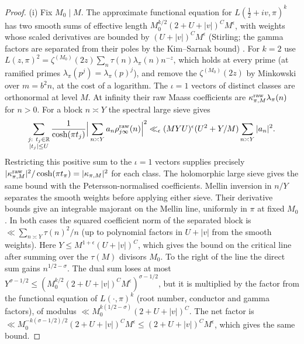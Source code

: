 \documentclass[11pt,colorlinks]{charlie}
\begin{document}
\begin{proof}
(i) Fix $M_0\mid M$. The approximate functional equation for $L(\frac12+iv,\pi)^k$ has two smooth sums of effective length $M_0^{k/2}(2+U+|v|)^{C}M^\epsilon$, with weights whose scaled derivatives are bounded by $(U+|v|)^C M^\epsilon$ (Stirling; the gamma factors are separated from their poles by the Kim--Sarnak bound) \cite[Theorem~5.3]{IK}. For $k=2$ use $L(z,\pi)^2=\zeta^{(M_0)}(2z)\sum_n\tau(n)\lambda_\pi(n)n^{-z}$, which holds at every prime (at ramified primes $\lambda_\pi(p^j)=\lambda_\pi(p)^j$), and remove the $\zeta^{(M_0)}(2z)$ by Minkowski over $m=b^2n$, at the cost of a logarithm. The $\iota=1$ vectors of distinct classes are orthonormal at level $M$. At infinity their raw Maass coefficients are $\kappa^{\rm raw}_{\pi,M}\lambda_\pi(n)$ for $n>0$. For a block $n\asymp Y$ the spectral large sieve \cite[Theorem~2]{DI} gives
\[
 \sum_{\substack{j:\ t_j\in\mathbb{R}\\ |t_j|\le U}}
 \frac{1}{\cosh(\pi t_j)}
 \Big|\sum_{n\asymp Y}a_n\rho^{\rm raw}_{j\infty}(n)\Big|^2
 \ll_\epsilon(MYU)^\epsilon(U^2+Y/M)\sum_{n\asymp Y}|a_n|^2 .
\]
Restricting this positive sum to the $\iota=1$ vectors supplies precisely $|\kappa^{\rm raw}_{\pi,M}|^2/\cosh(\pi t_\pi)=|\kappa_{\pi,M}|^2$ for each class. The holomorphic large sieve gives the same bound with the Petersson-normalised coefficients. Mellin inversion in $n/Y$ separates the smooth weights before applying either sieve. Their derivative bounds give an integrable majorant on the Mellin line, uniformly in $\pi$ at fixed $M_0$. In both cases the squared coefficient norm of the separated block is $\ll\sum_{n\asymp Y}\tau(n)^2/n$ (up to polynomial factors in $U+|v|$ from the smooth weights). Here $Y\le M^{1+\epsilon}(U+|v|)^C$, which gives the bound on the critical line after summing over the $\tau(M)$ divisors $M_0$. To the right of the line the direct sum gains $n^{1/2-\sigma}$. The dual sum loses at most $Y^{\sigma-1/2}\le(M_0^{k/2}(2+U+|v|)^CM^\epsilon)^{\sigma-1/2}$, but it is multiplied by the factor from the functional equation of $L(\cdot,\pi)^k$ (root number, conductor and gamma factors), of modulus $\ll M_0^{k(1/2-\sigma)}(2+U+|v|)^C$. The net factor is $\ll M_0^{-k(\sigma-1/2)/2}(2+U+|v|)^CM^\epsilon\le(2+U+|v|)^CM^\epsilon$, which gives the same bound.


\end{proof}
\end{document}
